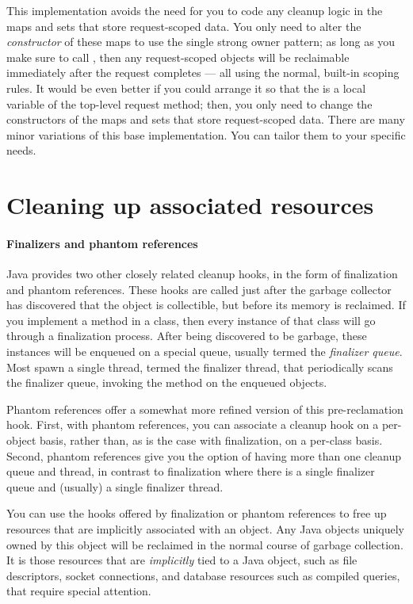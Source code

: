This implementation avoids the need for you to code any cleanup logic in the maps
and sets that store request-scoped data. You only need to alter the
\emph{constructor} of these maps to use the single strong owner pattern; as long
as you make sure to call , then any request-scoped
objects will be reclaimable immediately after the request completes --- all using
the normal, built-in scoping rules. It would be even better if you could arrange
it so that the  is a local variable of the
top-level request method; then, you only need to change the constructors of the
maps and sets that store request-scoped data. There are many minor variations of
this base implementation. You can tailor them to your specific needs.

\section{Cleaning up associated resources}
\paragraph{Finalizers and phantom references}
Java provides two other closely related cleanup hooks, in the form of
finalization and phantom references. These hooks are called just after the
garbage collector has discovered that the object is collectible, but before its
memory is reclaimed. If you implement a  method in a class, then
every instance of that class will go through a finalization process. After being
discovered to be garbage, these instances will be enqueued on a special queue,
usually termed the \emph{finalizer queue}. Most \jres spawn a single thread,
termed the finalizer thread, that periodically scans the finalizer queue,
invoking the  method on the enqueued objects.

Phantom references offer a somewhat more refined version of this pre-reclamation
hook. First, with phantom references, you can associate a cleanup hook on a
per-object basis, rather than, as is the case with finalization, on a per-class
basis. Second, phantom references give you the option of having more than one
cleanup queue and thread, in contrast to finalization where there is a single
finalizer queue and (usually) a single finalizer thread.

You can use the hooks offered by finalization or phantom references to free up
resources that are implicitly associated with an object. Any Java objects
uniquely owned by this object will be reclaimed in the normal course of garbage
collection. It is those resources that are \emph{implicitly} tied to a Java
object, such as file descriptors, socket connections, and database resources such
as compiled queries, that require special attention.

